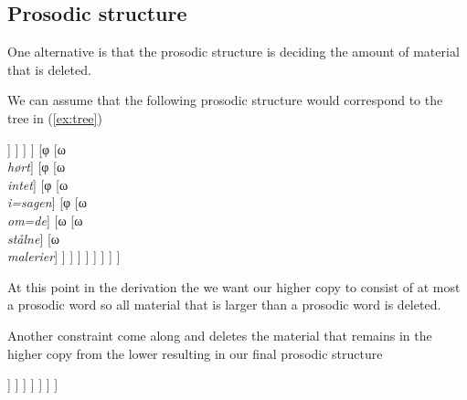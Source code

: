 \documentclass[12pt, letterpaper]{article}
\begin{document}
\subsection{Prosodic structure} \label{sec:OT}
\ea One alternative is that the prosodic structure is deciding the amount of material that is deleted.  

\ex We can assume that the following prosodic structure would correspond to the tree in (\ref{ex:tree})
	\ea
	\begin{forest}
	[ι
		[φ\\\textit{Anna}]
		[φ [ω\\\textit{har}]
			[φ
				[φ  [ω\\\emph{intet}]
					[φ [ω\\\emph{i=sagen}]
						[φ [ω\\\emph{om=de}]
							[ω [ω\\\emph{stålne}]
								[ω\\\emph{malerier}]
							]
						]	
					]
				]
				[φ [ω\\\textit{hørt}]
					[φ  [ω\\\emph{intet}]
						[φ [ω\\\emph{i=sagen}]
							[φ [ω\\\emph{om=de}]
								[ω [ω\\\emph{stålne}]
									[ω\\\emph{malerier}]
								]
							]	
						]
					]
				]
			]
		]
	]
	\end{forest}%
	\z 

\ex At this point in the derivation the we want our higher copy to consist of at most a prosodic word so all material that is larger than a prosodic word is deleted.

\ex Another constraint come along and deletes the material that remains in the higher copy from the lower resulting in our final prosodic structure
	\begin{forest}
	[ι
		[φ\\\textit{Anna}]
		[φ [ω\\\textit{har}]
			[φ [ω\\\emph{intet}]
				[φ [ω\\\textit{hørt}]
					[φ [ω\\\emph{i=sagen}]
						[φ [ω\\\emph{om=de}]
							[ω [ω\\\emph{stålne}]
								[ω\\\emph{malerier}]
							]
						]	
					]
				]
			]
		]
	]
	\end{forest}%
\z 
\end{document}
